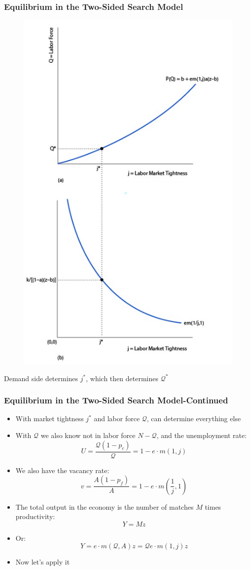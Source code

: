 \documentclass{beamer}
\begin{document}
\begin{frame}
\frametitle[alignment=center]{Equilibrium in the Two-Sided Search Model}
\begin{figure}
\centering
\includegraphics[scale=0.6]{Figures/W_Fig_6pt20.png}
\end{figure}
Demand side determines $j^*$, which then determines $\mathcal{Q}^*$
\end{frame}

\begin{frame}
\frametitle[alignment=center]{Equilibrium in the Two-Sided Search Model-Continued}
\begin{itemize}
\item With market tightness $j^*$ and labor force $\mathcal{Q}$, can determine everything else
\bigskip
\item With $\mathcal{Q}$ we also know not in labor force $N-\mathcal{Q}$, and the unemployment rate:
$$U=\frac{\mathcal{Q}(1-p_c)}{\mathcal{Q}}=1-e\cdot m(1,j)$$
\item We also have the vacancy rate:
$$v=\frac{A(1-p_f)}{A}=1-e\cdot m\left(\frac{1}{j},1\right)$$
\item The total output in the economy is the number of matches $M$ times productivity:
$$Y=Mz$$ 
\item Or:
$$Y=e\cdot m(\mathcal{Q},A)z=\mathcal{Q}e\cdot m(1,j)z$$
\item Now let's apply it
\end{itemize}
\end{frame}
\end{document}
